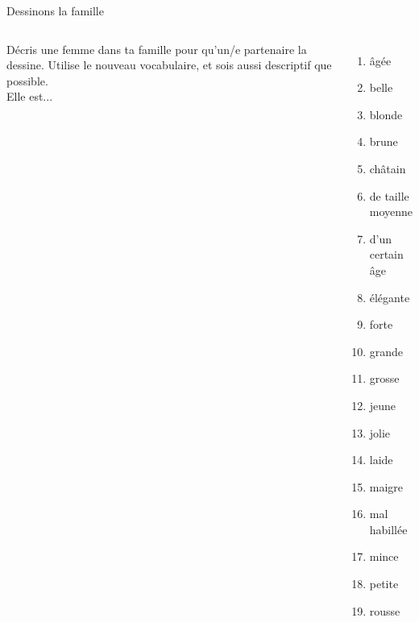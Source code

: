 \begin{frame}{Dessinons la famille}
  \begin{columns}
      Décris une femme dans ta famille pour qu'un/e partenaire la dessine.
      Utilise le nouveau vocabulaire, et sois aussi descriptif que possible. \\
      \tiny
      Elle est...
      \begin{enumerate}
        \item âgée
        \item belle
        \item blonde
        \item brune
        \item châtain
        \item de taille moyenne
        \item d'un certain âge
        \item élégante
        \item forte
        \item grande
        \item grosse
        \item jeune
        \item jolie
        \item laide
        \item maigre
        \item mal habillée
        \item mince
        \item petite
        \item rousse
      \end{enumerate}
      \tiny
        

\end{columns}
\end{frame}
